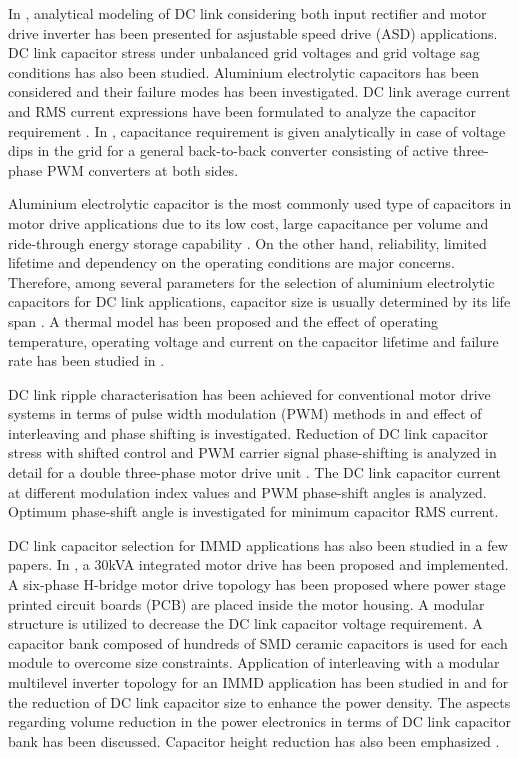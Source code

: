 \documentclass[conference,a4paper,twocolumn]{IEEEtran}
\begin{document}
In \cite{Lee2007}, analytical modeling of DC link considering both input rectifier and motor drive inverter has been presented for asjustable speed drive (ASD) applications. DC link capacitor stress under unbalanced grid voltages and grid voltage sag conditions has also been studied. Aluminium electrolytic capacitors has been considered and their failure modes has been investigated. DC link average current and RMS current expressions have been formulated to analyze the capacitor requirement \cite{Bianchi2003} \cite{Gohil2014} \cite{Rixin2007}. In \cite{Rixin}, capacitance requirement is given analytically in case of voltage dips in the grid for a general back-to-back converter consisting of active three-phase PWM converters at both sides.

Aluminium electrolytic capacitor is the most commonly used type of capacitors in motor drive applications due to its low cost, large capacitance per volume and ride-through energy storage capability \cite{Lee2007}. On the other hand, reliability, limited lifetime and dependency on the operating conditions are major concerns. Therefore, among several parameters for the selection of aluminium electrolytic capacitors for DC link applications, capacitor size is usually determined by its life span \cite{Lee2007}. A thermal model has been proposed and the effect of operating temperature, operating voltage and current on the capacitor lifetime and failure rate has been studied in \cite{Bianchi2003} \cite{Gohil2014}. 


DC link ripple characterisation has been achieved for conventional motor drive systems in terms of pulse width modulation (PWM) methods in \cite{Gohil2014} and effect of interleaving and phase shifting is investigated. Reduction of DC link capacitor stress with shifted control and PWM carrier signal phase-shifting is analyzed in detail for a double three-phase motor drive unit \cite{Basler2015}. The DC link capacitor current at different modulation index values and PWM phase-shift angles is analyzed. Optimum phase-shift angle is investigated for minimum capacitor RMS current.

DC link capacitor selection for IMMD applications has also been studied in a few papers. In \cite{Engelmann2015}, a 30kVA integrated motor drive has been proposed and implemented. A six-phase H-bridge motor drive topology has been proposed where power stage printed circuit boards (PCB) are placed inside the motor housing. A modular structure is utilized to decrease the DC link capacitor voltage requirement. A capacitor bank composed of hundreds of SMD ceramic capacitors is used for each module to overcome size constraints. Application of interleaving with a modular multilevel inverter topology for an IMMD application has been studied in \cite{Wang2014} and \cite{Wang2013} for the reduction of DC link capacitor size to enhance the power density. The aspects regarding volume reduction in the power electronics in terms of DC link capacitor bank has been discussed. Capacitor height reduction has also been emphasized \cite{Wang2013}.
\end{document}
